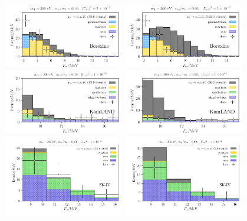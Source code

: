 \documentclass[
reprint,
superscriptaddress,
showpacs,
preprintnumbers,
nofootinbib,
nobibnotes,
amsmath,
amssymb, 
aps,
prd,
floatfix
]{revtex4-1}
\begin{document}
\begin{figure}[t]
\centering
\includegraphics[width=0.47\textwidth]{scalar_borexino_MN_300_MB_30.pdf}
\includegraphics[width=0.47\textwidth]{scalar_borexino_MN_300_MB_270.pdf} \\
\includegraphics[width=0.47\textwidth]{binned_scalar_kamland_MN_300_MB_30.pdf}
\includegraphics[width=0.47\textwidth]{binned_scalar_kamland_MN_300_MB_270.pdf}\\
\includegraphics[width=0.47\textwidth]{scalar_SK-IV_MN_300_MB_30.pdf}
\includegraphics[width=0.47\textwidth]{scalar_SK-IV_MN_300_MB_270.pdf} 

\end{figure}
\end{document}
